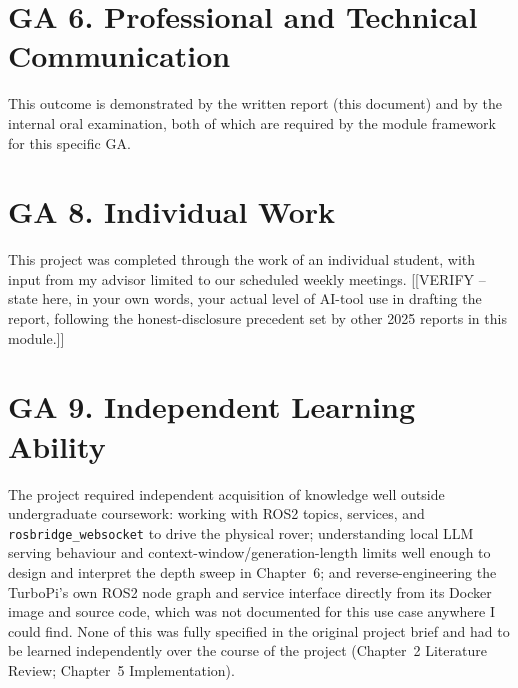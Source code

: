 \section*{GA 6. Professional and Technical Communication}

This outcome is demonstrated by the written report (this document) and by
the internal oral examination, both of which are required by the module
framework for this specific GA.

\section*{GA 8. Individual Work}

This project was completed through the work of an individual student,
with input from my advisor limited to our scheduled weekly meetings.
[[VERIFY -- state here, in your own words, your actual level of AI-tool
use in drafting the report, following the honest-disclosure precedent set
by other 2025 reports in this module.]]

\section*{GA 9. Independent Learning Ability}

The project required independent acquisition of knowledge well outside
undergraduate coursework: working with ROS2 topics, services, and
\texttt{rosbridge\_websocket} to drive the physical rover; understanding
local LLM serving behaviour and context-window/generation-length limits
well enough to design and interpret the depth sweep in Chapter~6; and
reverse-engineering the TurboPi's own ROS2 node graph and service interface
directly from its Docker image and source code, which was not documented
for this use case anywhere I could find. None of this was fully specified
in the original project brief and had to be learned independently over the
course of the project (Chapter~2 Literature Review; Chapter~5
Implementation).
